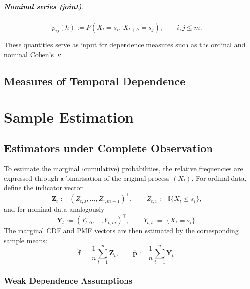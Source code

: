 \documentclass[12pt,a4paper]{scrreprt}
\begin{document}
\paragraph{Nominal series (joint).}
\[
    p_{ij}(h) := P(X_t = s_i,\, X_{t+h} = s_j),
    \qquad i,j \leq m.
\]

These quantities serve as input for dependence measures such as the ordinal and nominal
Cohen's~$\kappa$.

\section{Measures of Temporal Dependence}


\chapter*{Sample Estimation}

\section{Estimators under Complete Observation}

To estimate the marginal (cumulative) probabilities, the relative frequencies are expressed
through a binarisation of the original process $(X_t)$. For ordinal data, define the indicator
vector
\[
    \mathbf{Z}_t := (Z_{t,0}, \ldots, Z_{t,m-1})^{\top},
    \qquad
    Z_{t,i} := \mathbb{I}\{X_t \leq s_i\},
\]
and for nominal data analogously
\[
    \mathbf{Y}_t := (Y_{t,0}, \ldots, Y_{t,m})^{\top},
    \qquad
    Y_{t,i} := \mathbb{I}\{X_t = s_i\}.
\]
The marginal CDF and PMF vectors are then estimated by the corresponding sample means:
\[
    \hat{\mathbf{f}} := \frac{1}{n} \sum_{t=1}^n \mathbf{Z}_t,
    \qquad
    \hat{\mathbf{p}} := \frac{1}{n} \sum_{t=1}^n \mathbf{Y}_t.
\]

\subsection{Weak Dependence Assumptions}
\end{document}
